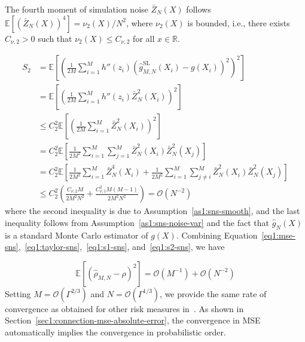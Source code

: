 \begin{assumption} \label{as1:sns-noise-var}
    The fourth moment of simulation noise $\bar{Z}_N(X)$ follows $\mathbb{E} \left[ \left( \bar{Z}_N(X) \right)^4 \right] = \nu_2(X) / N^2$, where $\nu_2(X)$ is bounded, i.e., there exists $C_{\nu,2} > 0$ such that $\nu_2(X) \leq C_{\nu,2}$ for all $x \in \mathbb{R}$.
\end{assumption}

\begin{align} \label{eq1:s2-sns}
    S_2 & = \mathbb{E} \left[ \left( \frac{1}{2M} \sum_{i=1}^M h''\left( z_i \right) \left( \hat{g}^{\text{SL}}_{M, N}(X_i) - g(X_i) \right)^2 \right)^2\right] \nonumber \\
    & = \mathbb{E} \left[ \left(\frac{1}{2M} \sum_{i=1}^M h''\left( z_i \right) \bar{Z}^2_N(X_i) \right)^2 \right] \nonumber \\
    & \leq C_2^2 \mathbb{E} \left[ \left(\frac{1}{2M} \sum_{i=1}^M \bar{Z}^2_N(X_i) \right)^2 \right] \nonumber \\
    & = C_2^2 \mathbb{E} \left[ \frac{1}{2M^2} \sum_{i=1}^M \sum_{j=1}^M \bar{Z}^2_N(X_i) \bar{Z}^2_N(X_j) \right] \nonumber \\
    & = C_2^2 \mathbb{E} \left[ \frac{1}{2M^2} \sum_{i=1}^M \bar{Z}_N^4(X_i) + \frac{1}{2M^2} \sum_{i=1}^M \sum_{j \neq i}^M \bar{Z}_N^2(X_i) \bar{Z}_N^2(X_j) \right] \nonumber \\
    & \leq  C_2^2 \left(\frac{ C_{\nu, 2} M}{2M^2N^2} + \frac{C_{\nu,1}^2M(M-1)}{2M^2N^2}\right) = \mathcal{O}(N^{-2})
\end{align}
where the second inequality is due to Assumption~\ref{as1:sns-smooth}, and the last inequality follows from Assumption~\ref{as1:sns-noise-var} and the fact that $\hat{g}_{N}(X)$ is a standard Monte Carlo estimator of $g(X)$.
Combining Equation~\ref{eq1:mse-sns},~\ref{eq1:taylor-sns},~\ref{eq1:s1-sns}, and~\ref{eq1:s2-sns}, we have

\begin{equation} \label{eq1:mse-sns-smooth}
    \mathbb{E} \left[ \left( \hat{\rho}_{M, N} - \rho \right)^2 \right] = \mathcal{O}(M^{-1}) + \mathcal{O}(N^{-2})
\end{equation}
Setting $M = \mathcal{O}(\Gamma^{2/3})$ and $N = \mathcal{O}(\Gamma^{1/3})$, we provide the same rate of convergence as obtained for other risk measures in~\cite{gordy2010nested}.
As shown in Section~\ref{sec1:connection-mse-absolute-error}, the convergence in MSE automatically implies the convergence in probabilistic order.

